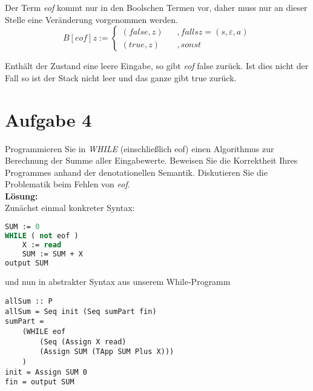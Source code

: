 \documentclass[11pt,a4paper,ngerman]{article}
\begin{document}
Der Term \emph{eof} kommt nur in den Boolschen Termen vor, daher muss nur an dieser 
Stelle eine Veränderung vorgenommen werden.\\

$$
B[eof]z :=
\left\{\begin{array}{lr}
(false,z) \;\;\;&,falls z=(s,\varepsilon,a)\\
(true,z) &, sonst
\end{array}\right.
$$

Enthält der Zustand eine leere Eingabe, so gibt \emph{eof} false zurück.
Ist dies nicht der Fall so ist der Stack nicht leer und das ganze gibt true zurück.


\section*{Aufgabe 4}


Programmieren Sie in \emph{WHILE} (einschließlich eof) einen Algorithmus
zur Berechnung der Summe aller Eingabewerte. Beweisen Sie die Korrektheit
Ihres Programmes anhand der denotationellen Semantik. Diskutieren Sie die
Problematik beim Fehlen von \emph{eof}.\\

\textbf{Lösung:}\\


Zunächst einmal konkreter Syntax:
\begin{lstlisting}[language=Pascal]
SUM := 0
WHILE ( not eof )
    X := read
    SUM := SUM + X
output SUM
\end{lstlisting}
und nun in abstrakter Syntax aus unserem While-Programm
\begin{lstlisting}
allSum :: P
allSum = Seq init (Seq sumPart fin)
sumPart = 
    (WHILE eof
        (Seq (Assign X read)
        (Assign SUM (TApp SUM Plus X)))
    )
init = Assign SUM 0
fin = output SUM
\end{lstlisting}
\end{document}
